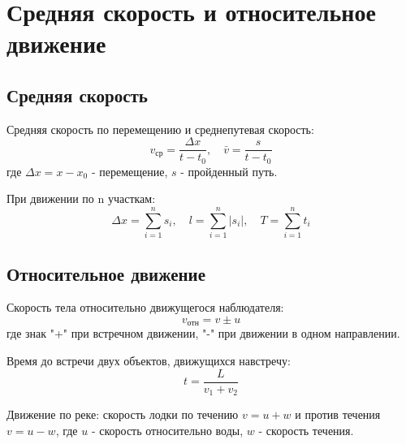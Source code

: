 \documentclass{article}
\begin{document}
\section*{Средняя скорость и относительное движение}

\subsection*{Средняя скорость}
Средняя скорость по перемещению и среднепутевая скорость:
\[
v_{\mathrm{ср}} = \frac{\Delta x}{t - t_0}, \quad \bar v = \frac{s}{t - t_0}
\]
где $\Delta x = x - x_0$ - перемещение, $s$ - пройденный путь.

При движении по n участкам:
\[
\Delta x = \sum_{i=1}^n s_i, \quad l = \sum_{i=1}^n |s_i|, \quad T = \sum_{i=1}^n t_i
\]

\subsection*{Относительное движение}
Скорость тела относительно движущегося наблюдателя:
\[
v_{\mathrm{отн}} = v \pm u
\]
где знак "+" при встречном движении, "-" при движении в одном направлении.

Время до встречи двух объектов, движущихся навстречу:
\[
t = \frac{L}{v_1 + v_2}
\]

Движение по реке: скорость лодки по течению $v = u + w$ и против течения $v = u - w$, где $u$ - скорость относительно воды, $w$ - скорость течения.
\end{document}
